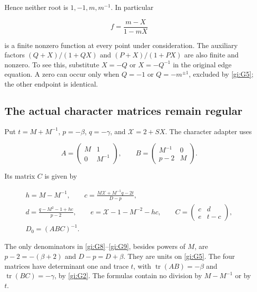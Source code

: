 Hence neither root is \(1,-1,m,m^{-1}\). In particular

\begin{equation}\label{gi:G7}
f=\frac{m-X}{1-mX}
\end{equation}

is a finite nonzero function at every point under consideration.
The auxiliary factors \((Q+X)/(1+QX)\) and
\((P+X)/(1+PX)\) are also finite and nonzero. To see this,
substitute \(X=-Q\) or \(X=-Q^{-1}\) in the original edge
equation. A zero can occur only when \(Q=-1\) or
\(Q=-m^{\pm1}\), excluded by \eqref{gi:G5}; the other endpoint is
identical.

\subsection{The actual character matrices remain regular}\label{gi:the-actual-character-matrices-remain-regular}

Put \(t=M+M^{-1}\), \(p=-\beta\), \(q=-\gamma\), and
\(\mathcal X=2+SX\). The character adapter uses

\begin{equation}\label{gi:G8}
A=\begin{pmatrix}M&1\\0&M^{-1}\end{pmatrix},\qquad
 B=\begin{pmatrix}M^{-1}&0\\p-2&M\end{pmatrix}.
\end{equation}

Its matrix \(C\) is given by

\begin{equation}\label{gi:G9}
\begin{gathered}
 h=M-M^{-1},\qquad
 c=\frac{M\mathcal X+M^{-1}q-2t}{D-p},\\
 d=\frac{q-M^2-1+hc}{p-2},\qquad
 e=\mathcal X-1-M^{-2}-hc,\qquad
 C=\begin{pmatrix}c&d\\e&t-c\end{pmatrix},\\
                         D_0=(ABC)^{-1}.
\end{gathered}
\end{equation}

The only denominators in \eqref{gi:G8}--\eqref{gi:G9}, besides powers of \(M\),
are \(p-2=-(\beta+2)\) and \(D-p=D+\beta\).
They are units on \eqref{gi:G5}. The four matrices have determinant one
and trace \(t\), with
\(\operatorname{tr}(AB)=-\beta\) and
\(\operatorname{tr}(BC)=-\gamma\), by \eqref{gi:G2}.
The formulas contain no division by \(M-M^{-1}\) or by \(t\).

